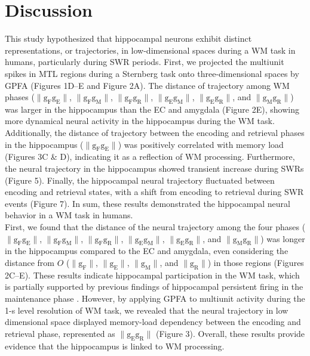 \documentclass[final,3p,times,twocolumn]{elsarticle}
\begin{document}
\section{Discussion}
This study hypothesized that hippocampal neurons exhibit distinct representations, or trajectories, in low-dimensional spaces during a WM task in humans, particularly during SWR periods. First, we projected the multiunit spikes in MTL regions during a Sternberg task onto three-dimensional spaces by GPFA (Figures 1D--E and Figure 2A). The distance of trajectory among WM phases ($\mathrm{\lVert g_{F}g_{E} \rVert}$, $\mathrm{\lVert g_{F}g_{M} \rVert}$, $\mathrm{\lVert g_{F}g_{R} \rVert}$, $\mathrm{\lVert g_{E}g_{M} \rVert}$, $\mathrm{\lVert g_{E}g_{R} \rVert}$, and $\mathrm{\lVert g_{M}g_{R} \rVert}$) was larger in the hippocampus than the EC and amygdala (Figure 2E), showing more dynamical neural activity in the hippocampus during the WM task. Additionally, the distance of trajectory between the encoding and retrieval phases in the hippocampus ($\mathrm{\lVert g_{F}g_{E} \rVert}$) was positively correlated with memory load (Figures 3C \& D), indicating it as a reflection of WM processing. Furthermore, the neural trajectory in the hippocampus showed transient increase during SWRs (Figure 5). Finally, the hippocampal neural trajectory fluctuated between encoding and retrieval states, with a shift from encoding to retrieval during SWR events (Figure 7). In sum, these results demonstrated the hippocampal neural behavior in a WM task in humans.
\\
\indent
First, we found that the distance of the neural trajectory among the four phases ($\mathrm{\lVert g_{F}g_{E} \rVert}$, $\mathrm{\lVert g_{F}g_{M} \rVert}$, $\mathrm{\lVert g_{F}g_{R} \rVert}$, $\mathrm{\lVert g_{E}g_{M} \rVert}$, $\mathrm{\lVert g_{E}g_{R} \rVert}$, and $\mathrm{\lVert g_{M}g_{R} \rVert}$) was longer in the hippocampus compared to the EC and amygdala, even considering the distance from $O$ ($\mathrm{\lVert g_{F} \rVert}$, $\mathrm{\lVert g_{E} \rVert}$, $\mathrm{\lVert g_{M} \rVert}$, and $\mathrm{\lVert g_{R} \rVert}$) in those regions (Figures 2C--E). These results indicate hippocampal participation in the WM task, which is partially supported by previous findings of hippocampal persistent firing in the maintenance phase \cite{boran_persistent_2019} \cite{kaminski_persistently_2017} \cite{kornblith_persistent_2017} \cite{faraut_dataset_2018}. However, by applying GPFA to multiunit activity during the 1-s level resolution of WM task, we revealed that the neural trajectory in low dimensional space displayed memory-load dependency between the encoding and retrieval phase, represented as $\mathrm{\lVert g_{E}g_{R} \rVert}$ (Figure 3). Overall, these results provide evidence that the hippocampus is linked to WM processing.
\end{document}
